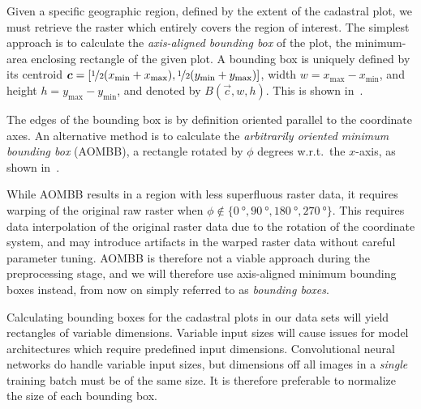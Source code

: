Given a specific geographic region, defined by the extent of the cadastral plot, we must retrieve the raster which entirely covers the region of interest.
The simplest approach is to calculate the \textit{axis-aligned bounding box} of the plot, the minimum-area enclosing rectangle of the given plot.
A bounding box is uniquely defined by its centroid $\vec{c} = [\nicefrac{1}{2}(x_{\mathrm{\min}} + x_{\mathrm{\max}}), \nicefrac{1}{2}(y_{\mathrm{\min}} + y_{\mathrm{\max}})]$, width $w = x_{\mathrm{\max}} - x_{\mathrm{\min}}$, and height $h = y_{\mathrm{\max}} - y_{\mathrm{\min}}$, and denoted by $B(\vec{c}, w, h)$.
This is shown in~.

\begin{figure}[htb]
  \captionsetup[subfigure]{position=b}
  \centering
  \hspace{2em}
\end{figure}

The edges of the bounding box is by definition oriented parallel to the coordinate axes.
An alternative method is to calculate the \textit{arbitrarily oriented minimum bounding box} (AOMBB), a rectangle rotated by $\phi$ degrees w.r.t.\ the $x$-axis, as shown in~.

While AOMBB results in a region with less superfluous raster data, it requires warping of the original raw raster when $\phi \not\in \{ \SI{0}{\degree}, \SI{90}{\degree}, \SI{180}{\degree}, \SI{270}{\degree} \}$.
This requires data interpolation of the original raster data due to the rotation of the coordinate system, and may introduce artifacts in the warped raster data without careful parameter tuning.
AOMBB is therefore not a viable approach during the preprocessing stage, and we will therefore use axis-aligned minimum bounding boxes instead, from now on simply referred to as \textit{bounding boxes}.

Calculating bounding boxes for the cadastral plots in our data sets will yield rectangles of variable dimensions.
Variable input sizes will cause issues for model architectures which require predefined input dimensions.
Convolutional neural networks do handle variable input sizes, but dimensions off all images in a \textit{single} training batch must be of the same size.
It is therefore preferable to normalize the size of each bounding box.

